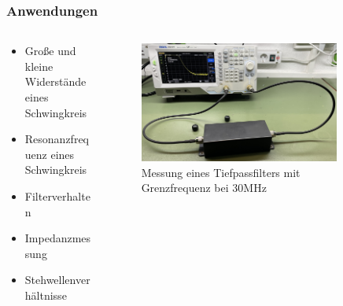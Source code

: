 \begin{frame}
\frametitle{Anwendungen}
\begin{columns}
    \begin{column}{0.48\textwidth}
    \begin{itemize}
  \item Große und kleine Widerstände eines Schwingkreis
  \item Resonanzfrequenz eines Schwingkreis
  \item Filterverhalten
  \item Impedanzmessung
  \item Stehwellenverhältnisse
  \end{itemize}

    \end{column}
   \begin{column}{0.48\textwidth}
       
\begin{figure}
    \includegraphics[width=0.85\textwidth]{foto/201}
    \caption{\scriptsize Messung eines Tiefpassfilters mit Grenzfrequenz bei 30MHz}
    \label{e_vna_tiefpassmessung}
\end{figure}

   \end{column}
\end{columns}

\end{frame}


